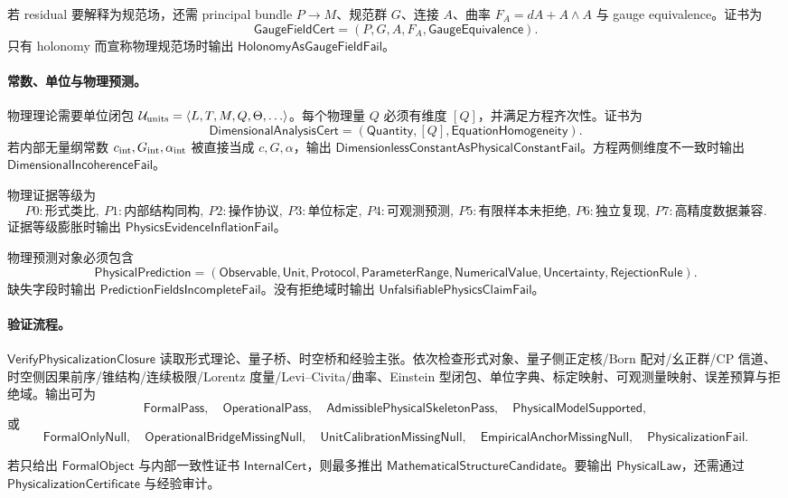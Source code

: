 若 residual 要解释为规范场，还需 principal bundle \(P\to M\)、规范群 \(G\)、连接 \(A\)、曲率 \(F_A=dA+A\wedge A\) 与 gauge equivalence。证书为
\[
\boxed{\mathsf{GaugeFieldCert}=(P,G,A,F_A,\mathsf{GaugeEquivalence}).}
\]
只有 holonomy 而宣称物理规范场时输出 \(\mathsf{HolonomyAsGaugeFieldFail}\)。

\paragraph{常数、单位与物理预测。}
物理理论需要单位闭包 \(\mathcal U_{\rm units}=\langle L,T,M,Q,\Theta,\ldots\rangle\)。每个物理量 \(Q\) 必须有维度 \([Q]\)，并满足方程齐次性。证书为
\[
\boxed{\mathsf{DimensionalAnalysisCert}=(\mathsf{Quantity},[Q],\mathsf{EquationHomogeneity}).}
\]
若内部无量纲常数 \(c_{\rm int},G_{\rm int},\alpha_{\rm int}\) 被直接当成 \(c,G,\alpha\)，输出 \(\mathsf{DimensionlessConstantAsPhysicalConstantFail}\)。方程两侧维度不一致时输出 \(\mathsf{DimensionalIncoherenceFail}\)。

物理证据等级为
\[
\boxed{P0:\text{形式类比},\ P1:\text{内部结构同构},\ P2:\text{操作协议},\ P3:\text{单位标定},\ P4:\text{可观测预测},\ P5:\text{有限样本未拒绝},\ P6:\text{独立复现},\ P7:\text{高精度数据兼容}.}
\]
证据等级膨胀时输出 \(\mathsf{PhysicsEvidenceInflationFail}\)。

物理预测对象必须包含
\[
\boxed{\mathsf{PhysicalPrediction}=(\mathsf{Observable},\mathsf{Unit},\mathsf{Protocol},\mathsf{ParameterRange},\mathsf{NumericalValue},\mathsf{Uncertainty},\mathsf{RejectionRule}).}
\]
缺失字段时输出 \(\mathsf{PredictionFieldsIncompleteFail}\)。没有拒绝域时输出 \(\mathsf{UnfalsifiablePhysicsClaimFail}\)。

\paragraph{验证流程。}
\(\mathsf{VerifyPhysicalizationClosure}\) 读取形式理论、量子桥、时空桥和经验主张。依次检查形式对象、量子侧正定核/Born 配对/幺正群/CP 信道、时空侧因果前序/锥结构/连续极限/Lorentz 度量/Levi--Civita/曲率、Einstein 型闭包、单位字典、标定映射、可观测量映射、误差预算与拒绝域。输出可为
\[
\mathsf{FormalPass},\quad
\mathsf{OperationalPass},\quad
\mathsf{AdmissiblePhysicalSkeletonPass},\quad
\mathsf{PhysicalModelSupported},
\]
或
\[
\mathsf{FormalOnlyNull},\quad
\mathsf{OperationalBridgeMissingNull},\quad
\mathsf{UnitCalibrationMissingNull},\quad
\mathsf{EmpiricalAnchorMissingNull},\quad
\mathsf{PhysicalizationFail}.
\]

\begin{theorem}[形式结构不推出物理定律]\label{thm:typed-address-biaxial-completion-formal-structure-not-physical-law}
若只给出 \(\mathsf{FormalObject}\) 与内部一致性证书 \(\mathsf{InternalCert}\)，则最多推出 \(\mathsf{MathematicalStructureCandidate}\)。要输出 \(\mathsf{PhysicalLaw}\)，还需通过 \(\mathsf{PhysicalizationCertificate}\) 与经验审计。
\end{theorem}

